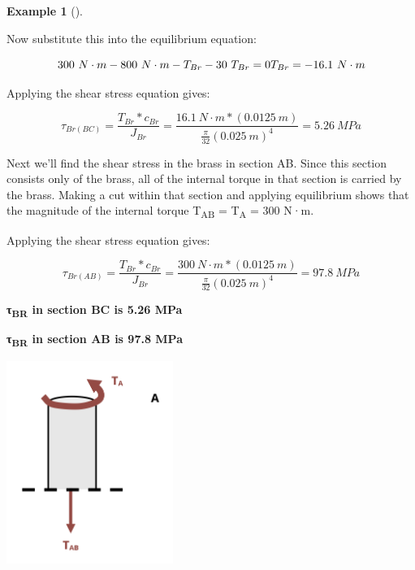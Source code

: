 \documentclass[
  letterpaper,
  DIV=11,
  numbers=noendperiod]{scrreprt}
\theoremstyle{definition}
\newtheorem{example}{Example}[chapter]
\theoremstyle{remark}
\begin{document}
\begin{tcolorbox}
\begin{example}[]
\begin{tcolorbox}
Now substitute this into the equilibrium equation:

\[
300{~N}\cdot{m}-800{~N}\cdot{m}-T_{Br}-30~T_{Br}=0 \\
T_{Br}=-16.1 {~N}\cdot{m}
\]

Applying the shear stress equation gives:

\[
\tau_{Br(B C)}=\frac{T_{Br}*c_{Br}}{J_{Br}}=\frac{16.1{~N}\cdot{m}*(0.0125{~m})}{\frac{\pi}{32}(0.025{~m})^4}=5.26{~MPa}
\]

Next we'll find the shear stress in the brass in section AB. Since this
section consists only of the brass, all of the internal torque in that
section is carried by the brass. Making a cut within that section and
applying equilibrium shows that the magnitude of the internal torque
T\textsubscript{AB} = T\textsubscript{A} = 300 N·m.

Applying the shear stress equation gives:

\[
\tau_{Br(AB)}=\frac{T_{Br}*c_{Br}}{J_{Br}}=\frac{300{~N}\cdot{m}*(0.0125{~m})}{\frac{\pi}{32}(0.025{~m})^4}=97.8{~MPa}
\]

\textbf{τ\textsubscript{BR} in section BC is 5.26 MPa}

\textbf{τ\textsubscript{BR} in section AB is 97.8 MPa}

\begin{center}
\includegraphics[width=2.13542in,height=\textheight]{images/CH6 PNGs/example 6.6 part 3.png}
\end{center}

\end{tcolorbox}

\end{example}

\end{tcolorbox}
\end{document}
